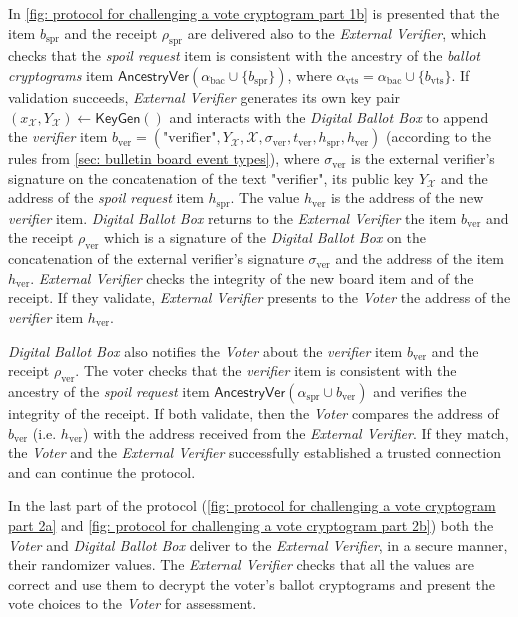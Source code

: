 In \cref{fig: protocol for challenging a vote cryptogram part 1b} is presented that the item $b_\mathrm{spr}$ and the receipt $\rho_\mathrm{spr}$ are delivered also to the \textit{External Verifier}, which checks that the \textit{spoil request} item is consistent with the ancestry of the \textit{ballot cryptograms} item $\mathsf{AncestryVer}(\alpha_\mathrm{bac} \cup \{ b_\mathrm{spr} \})$, where $\alpha_\mathrm{vts} = \alpha_\mathrm{bac} \cup \{ b_\mathrm{vts} \}$. If validation succeeds, \textit{External Verifier} generates its own key pair $(x_\mathcal{X}, Y_\mathcal{X}) \gets \mathsf{KeyGen}()$ and interacts with the \textit{Digital Ballot Box} to append the \textit{verifier} item $b_\mathrm{ver} = (\text{"verifier"}, Y_\mathcal{X}, \mathcal{X}, \sigma_\mathrm{ver}, t_\mathrm{ver}, h_\mathrm{spr}, h_\mathrm{ver})$ (according to the rules from \cref{sec: bulletin board event types}), where $\sigma_\mathrm{ver}$ is the external verifier's signature on the concatenation of the text "verifier", its public key $Y_\mathcal{X}$ and the address of the \textit{spoil request} item $h_\mathrm{spr}$. The value $h_\mathrm{ver}$ is the address of the new \textit{verifier} item. \textit{Digital Ballot Box} returns to the \textit{External Verifier} the item $b_\mathrm{ver}$ and the receipt $\rho_\mathrm{ver}$ which is a signature of the \textit{Digital Ballot Box} on the concatenation of the external verifier's signature $\sigma_\mathrm{ver}$ and the address of the item $h_\mathrm{ver}$. \textit{External Verifier} checks the integrity of the new board item and of the receipt. If they validate, \textit{External Verifier} presents to the \textit{Voter} the address of the \textit{verifier} item $h_\mathrm{ver}$.

\textit{Digital Ballot Box} also notifies the \textit{Voter} about the \textit{verifier} item $b_\mathrm{ver}$ and the receipt $\rho_\mathrm{ver}$. The voter checks that the \textit{verifier} item is consistent with the ancestry of the \textit{spoil request} item $\mathsf{AncestryVer}(\alpha_\mathrm{spr} \cup b_\mathrm{ver})$ and verifies the integrity of the receipt. If both validate, then the \textit{Voter} compares the address of $b_\mathrm{ver}$ (i.e. $h_\mathrm{ver}$) with the address received from the \textit{External Verifier}. If they match, the \textit{Voter} and the \textit{External Verifier} successfully established a trusted connection and can continue the protocol.

In the last part of the protocol (\cref{fig: protocol for challenging a vote cryptogram part 2a} and \cref{fig: protocol for challenging a vote cryptogram part 2b}) both the \textit{Voter} and \textit{Digital Ballot Box} deliver to the \textit{External Verifier}, in a secure manner, their randomizer values. The \textit{External Verifier} checks that all the values are correct and use them to decrypt the voter's ballot cryptograms and present the vote choices to the \textit{Voter} for assessment.

